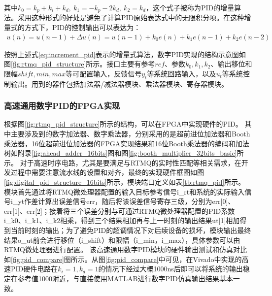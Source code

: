其中$k_0=k_p+k_i+k_d,\ k_1=-k_p-2k_d,\ k_2=k_d$，这个式子被称为PID的增量算法。采用这种形式的好处是避免了计算PID原始表达式中的无限积分项。在这种增量式的方式下，PID的控制输出可以表达为：
\begin{align}
    u(n)=u(n-1)+\Delta u(n)=u(n-1)+k_0 e(n)+k_1 e(n-1)+k_2 e(n-2)\label{eq:increment_pid}
\end{align}

按照上述式\eqref{eq:increment_pid}表示的增量式算法，数字PID实现的结构示意图如图\ref{fig:rtmq_pid_structure}所示。接口主要有参考$ref$、参数$k_0, k_1, k_2$、输出移位和限幅$shift, min, max$等可配置输入，反馈信号$y_t$等系统回路输入，以及$u_t$等系统控制输出。用到的器件包括加法器/减法器模块、乘法器模块、寄存器模块。

\subsubsection[高速通用数字PID的FPGA实现]{高速通用数字PID的FPGA实现}


根据图\ref{fig:rtmq_pid_structure}所示的结构，可以在FPGA中实现硬件的PID。
其中主要涉及到的数字加法器、数字乘法器，分别采用的是超前进位加法器和Booth乘法器，16位超前进位加法器的FPGA实现结果和16位Booth乘法器的编码和加法树如附录\ref{fig:ahead_adder_16bits}图和图\ref{fig:booth_multiplier_32bits_basic}所示。
对于高速时序电路，尤其是要满足与RTMQ的实时性匹配等相关需求，在开发过程中需要注意流水线的设置和对齐，最终的实现硬件框图如图\ref{fig:digital_pid_structure_16bits}所示，模块端口定义如表\ref{tb:rtmq_pid}所示。
模块首先通过将RTMQ微处理器配置的输入目标参考信号i\_rt和系统的实际输入信号i\_yt作差计算出误差信号err，随后将该误差信号寄存三级，分别为err[0]、err[1]、err[2]；接着将三个误差分别与可通过RTMQ微处理器配置的PID系数i\_k0、i\_k1、i\_k2相乘，得到三个结果相加再与上一时刻的输出结果ut[1]相加得到当前时刻的输出；为了避免PID的超调情况下对后续设备的损坏，模块输出最终结果o\_ut前会进行移位（i\_shift）和限幅（i\_min，i\_max），具体参数可以由RTMQ微处理器进行配置。
该高速通用数字PID模块的硬件输出测试和仿真对比如\ref{fig:pid_compare}图所示。从图\ref{fig:pid_compare}中可见，在Vivado中实现的高速PID硬件电路在$k_i=1, k_d=1$的情况下经过大概1000ns后即可以将系统的输出稳定在参考值1000附近，与直接使用MATLAB进行数字PID仿真输出结果基本一致。


